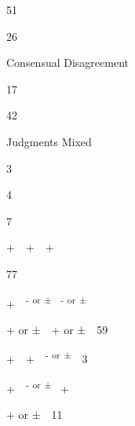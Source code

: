 \begin{multicols}{2}
\begin{styleStandard}
51
\end{styleStandard}


\begin{styleStandard}
26
\end{styleStandard}


\begin{styleStandard}
Consensual Disagreement
\end{styleStandard}


\begin{styleStandard}
17
\end{styleStandard}


\begin{styleStandard}
42
\end{styleStandard}


\begin{styleStandard}
Judgments Mixed
\end{styleStandard}


\begin{styleStandard}
3
\end{styleStandard}


\begin{styleStandard}
4
\end{styleStandard}


\begin{styleStandard}
7
\end{styleStandard}


\begin{styleStandard}
+\ \ +\ \ +
\end{styleStandard}


\begin{styleStandard}
77
\end{styleStandard}


\begin{styleStandard}
+\ \ \textsuperscript{{}-}\textsuperscript{ }\textsuperscript{or}\textsuperscript{ }\textsuperscript{±\ \ }\textsuperscript{{}-}\textsuperscript{ }\textsuperscript{or}\textsuperscript{ }\textsuperscript{±}
\end{styleStandard}


\begin{styleStandard}
+ or ±\ \ + or ±\ \ 59
\end{styleStandard}


\begin{styleStandard}
+\ \ +\ \ \textsuperscript{{}-}\textsuperscript{ }\textsuperscript{or}\textsuperscript{ }\textsuperscript{±}\ \ 3
\end{styleStandard}


\begin{styleStandard}
+\ \ \textsuperscript{{}-}\textsuperscript{ }\textsuperscript{or}\textsuperscript{ }\textsuperscript{±\ \ }+
\end{styleStandard}


\begin{styleStandard}
+ or ±\ \ 11
\end{styleStandard}


\end{multicols}
